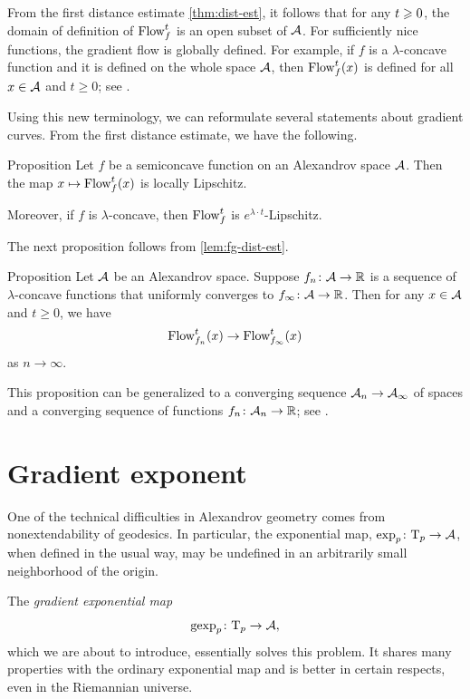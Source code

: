 From the first distance estimate \ref{thm:dist-est}, 
it follows that for any $t\z\ge 0$, the domain of definition of $\mathop{\rm Flow}\nolimits^t_f$ is an open subset of $\mathcal{A}$.
For sufficiently nice functions, the gradient flow is globally defined.
For example, if $f$ is a $\lambda$-concave function and it is defined on the whole space $\mathcal{A}$, then $\mathop{\rm Flow}\nolimits^t_f(x)$ is defined for all $x\in \mathcal{A}$ and $t\ge0$;
see \cite[16.19]{alexander-kapovitch-petrunin2024}.

Using this new terminology, we can reformulate several statements about gradient curves.
From the first distance estimate, we have the following.

\begin{thm}{Proposition}\label{prop:GF-is-lip}
Let $f$ be a semiconcave function on an Alexandrov space $\mathcal{A}$.
Then the map $x\mapsto\mathop{\rm Flow}\nolimits^t_f(x)$ is locally Lipschitz.

Moreover, if $f$ is $\lambda$-concave, then $\mathop{\rm Flow}\nolimits^t_f$ is $e^{\lambda\cdot t}$-Lipschitz.
\end{thm}

The next proposition follows from \ref{lem:fg-dist-est}.

\begin{thm}{Proposition}\label{grad-curve-conv}
Let $\mathcal{A}$ be an Alexandrov space.
Suppose $f_n\:\spc{A}\z\to\RR$ is a sequence of
$\lambda$-concave functions 
that uniformly converges to $f_\infty\:\spc{A}\z\to \RR$. 
Then for any $x\in \mathcal{A}$ and $t\ge 0$, we have
\[\mathop{\rm Flow}\nolimits_{f_n}^t(x)\to \mathop{\rm Flow}\nolimits_{f_\infty}^t(x)\]
as $n\to \infty$.
\end{thm}

This proposition can be generalized to a converging sequence $\spc{A}_n\z\to \spc{A}_\infty$ of spaces and a converging sequence of functions $f_n\:\spc{A}_n\z\to\RR$; see \cite[16.21]{alexander-kapovitch-petrunin2024}.

\section{Gradient exponent}\label{gexp}

One of the technical difficulties in Alexandrov geometry comes from
nonextendability of geodesics. 
In particular, the exponential map, $\exp_p\colon\mathrm{T}_p\to \mathcal{A}$,
when defined in the usual way, may be undefined
in an arbitrarily small neighborhood of the origin.

The \emph{gradient exponential map}
\[\operatorname{\rm gexp}\nolimits_p\colon\mathrm{T}_p\to\mathcal{A},\]
which we are about to introduce, essentially solves this problem.
It shares many properties with the ordinary exponential map and is better in certain respects,
even in the Riemannian universe.

